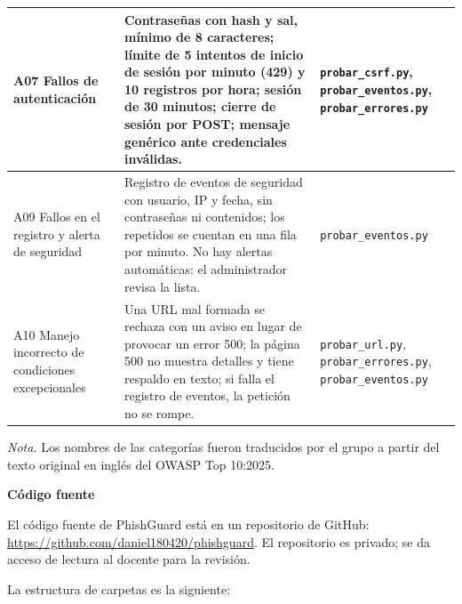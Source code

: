 \documentclass[journal,onecolumn,12pt,draftclsnofoot]{IEEEtran}
\newcommand{\apartado}[1]{\par\medskip\noindent\textbf{#1}\par\smallskip}
\begin{document}
\begin{longtable}{|>{\raggedright\arraybackslash}p{}|>{\raggedright\arraybackslash}p{}|>{\raggedright\arraybackslash}p{}|}
A07 Fallos de autenticación & Contraseñas con hash y sal, mínimo de 8 caracteres; límite de 5 intentos de inicio de sesión por minuto (429) y 10 registros por hora; sesión de 30 minutos; cierre de sesión por POST; mensaje genérico ante credenciales inválidas. & \texttt{probar\_csrf.py}, \texttt{probar\_eventos.py}, \texttt{probar\_errores.py} \\ \hline
A09 Fallos en el registro y alerta de seguridad & Registro de eventos de seguridad con usuario, IP y fecha, sin contraseñas ni contenidos; los repetidos se cuentan en una fila por minuto. No hay alertas automáticas: el administrador revisa la lista. & \texttt{probar\_eventos.py} \\ \hline
A10 Manejo incorrecto de condiciones excepcionales & Una URL mal formada se rechaza con un aviso en lugar de provocar un error 500; la página 500 no muestra detalles y tiene respaldo en texto; si falla el registro de eventos, la petición no se rompe. & \texttt{probar\_url.py}, \texttt{probar\_errores.py}, \texttt{probar\_eventos.py} \\ \hline
\end{longtable}
\endgroup

\noindent\footnotesize\textit{Nota.} Los nombres de las categorías fueron traducidos por el grupo a partir del texto original en inglés del OWASP Top 10:2025.\normalsize

\apartado{Código fuente}

El código fuente de PhishGuard está en un repositorio de GitHub: \url{https://github.com/daniel180420/phishguard}. El repositorio es privado; se da acceso de lectura al docente para la revisión.

La estructura de carpetas es la siguiente:
\end{document}
